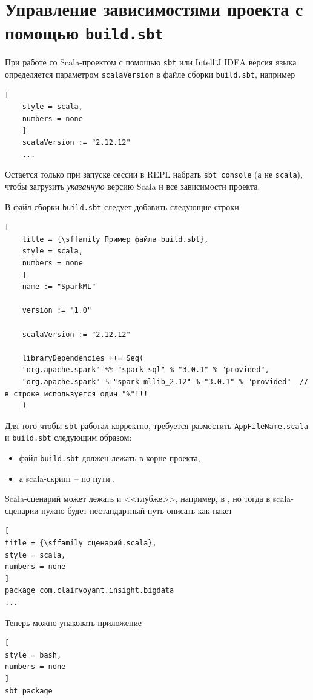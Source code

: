 \documentclass[%
	11pt,
	a4paper,
	utf8,
		]{article}
\begin{document}
\section{Управление зависимостями проекта с помощью \texttt{build.sbt}}

При работе со Scala-проектом с помощью \texttt{sbt} или IntelliJ IDEA версия языка определяется параметром \texttt{scalaVersion} в файле сборки \texttt{build.sbt}, например
\begin{lstlisting}[
	style = scala,
	numbers = none	
	]
	scalaVersion := "2.12.12"
	...
\end{lstlisting}

Остается только при запуске сессии в REPL набрать \texttt{sbt console} (а не \texttt{scala}), чтобы загрузить \emph{указанную} версию Scala и все зависимости проекта.

В файл сборки \texttt{build.sbt} следует добавить следующие строки
\begin{lstlisting}[
	title = {\sffamily Пример файла build.sbt},
	style = scala,
	numbers = none	
	]
	name := "SparkML"
	
	version := "1.0"
	
	scalaVersion := "2.12.12"
	
	libraryDependencies ++= Seq(
	"org.apache.spark" %% "spark-sql" % "3.0.1" % "provided",
	"org.apache.spark" % "spark-mllib_2.12" % "3.0.1" % "provided"  // в строке используется один "%"!!!
	)
\end{lstlisting}

Для того чтобы \texttt{sbt} работал корректно, требуется разместить \texttt{AppFileName.scala} и \texttt{build.sbt} следующим образом:
\begin{itemize}
	\item файл \texttt{build.sbt} должен лежать в корне проекта,
	
	\item а scala-скрипт -- по пути .
\end{itemize}

Scala-сценарий может лежать и <<глубже>>, например, в , но тогда в scala-сценарии нужно будет нестандартный путь описать как пакет
\begin{lstlisting}[
title = {\sffamily сценарий.scala},
style = scala,
numbers = none	
]
package com.clairvoyant.insight.bigdata
...
\end{lstlisting}

Теперь можно упаковать приложение
\begin{lstlisting}[
style = bash,
numbers = none	
]
sbt package
\end{lstlisting}
\end{document}
